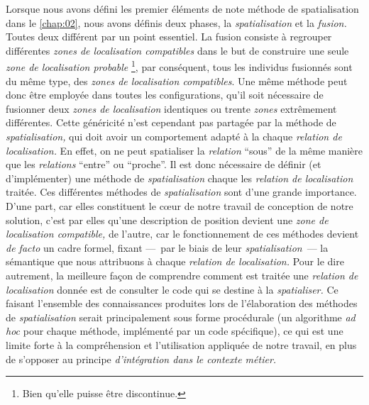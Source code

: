 Lorsque nous avons défini les premier éléments de note méthode de
spatialisation dans le \autoref{chap:02}, nous avons définis deux
phases, la \emph{spatialisation} et la \emph{fusion.}  Toutes deux
différent par un point essentiel. La fusion consiste à regrouper
différentes \emph{zones de localisation compatibles} dans le but de
construire une seule \emph{zone de localisation probable}
\footnote{Bien qu'elle puisse être discontinue.}, par conséquent, tous
les individus fusionnés sont du même type, des \emph{zones de
  localisation compatibles}. Une même méthode peut donc être employée
dans toutes les configurations, qu'il soit nécessaire de fusionner
deux \emph{zones de localisation} identiques ou trente \emph{zones}
extrêmement différentes. Cette généricité n'est cependant pas partagée
par la méthode de \emph{spatialisation,} qui doit avoir un
comportement adapté à la chaque \emph{relation de localisation.} En
effet, on ne peut spatialiser la \emph{relation} \enquote{sous} de la
même manière que les \emph{relations} \enquote{entre} ou
\enquote{proche}. Il est donc nécessaire de définir (et d'implémenter)
une méthode de \emph{spatialisation} chaque les \emph{relation de
  localisation} traitée. Ces différentes méthodes de
\emph{spatialisation} sont d'une grande importance. D'une part, car
elles constituent le cœur de notre travail de conception de notre
solution, c'est par elles qu'une description de position devient une
\emph{zone de localisation compatible,} de l'autre, car le
fonctionnement de ces méthodes devient \emph{de facto} un cadre
formel, fixant ---~par le biais de leur \emph{spatialisation}~--- la
sémantique que nous attribuons à chaque \emph{relation de
  localisation.} Pour le dire autrement, la meilleure façon de
comprendre comment est traitée une \emph{relation de localisation}
donnée est de consulter le code qui se destine à la
\emph{spatialiser.} Ce faisant l'ensemble des connaissances produites
lors de l'élaboration des méthodes de \emph{spatialisation} serait
principalement sous forme procédurale (\ie un algorithme \emph{ad hoc}
pour chaque méthode, implémenté par un code spécifique), ce qui est
une limite forte à la compréhension et l'utilisation appliquée de
notre travail, en plus de s'opposer au principe \emph{d'intégration
  dans le contexte métier.}

